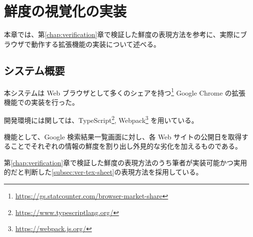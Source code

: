 \chapter{鮮度の視覚化の実装}
\label{chap:implementation}

本章では、第\ref{chap:verification}章で検証した鮮度の表現方法を参考に、実際にブラウザで動作する拡張機能の実装について述べる。

\section{システム概要}
\label{sec:imp_system}

本システムは Web ブラウザとして多くのシェアを持つ\footnote{\url{https://gs.statcounter.com/browser-market-share}} Google Chrome の拡張機能での実装を行った。

開発環境には関しては、TypeScript\footnote{\url{https://www.typescriptlang.org/}}, Webpack\footnote{\url{https://webpack.js.org/}} を用いている。

機能として、Google 検索結果一覧画面に対し、各 Web サイトの公開日を取得することでそれぞれの情報の鮮度を割り出し外見的な劣化を加えるものである。

第\ref{chap:verification}章で検証した鮮度の表現方法のうち筆者が実装可能かつ実用的だと判断した\ref{subsec:ver-tex-sheet}の表現方法を採用している。

